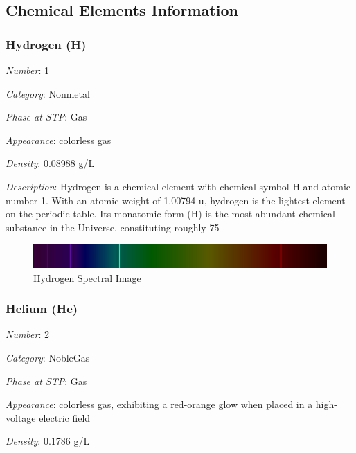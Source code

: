 \documentclass{article}
\begin{document}
\newpage

\subsection{Chemical Elements Information}
\label{anexo:elements_info}

\hypertarget{subsubsection::H}{}\subsubsection{Hydrogen (H)}

\textit{Number}: 1

\textit{Category}: Nonmetal

\textit{Phase at STP}: Gas

\textit{Appearance}: colorless gas

\textit{Density}: 0.08988 g/L

\textit{Description}: Hydrogen is a chemical element with chemical symbol H and atomic number 1. With an atomic weight of 1.00794 u, hydrogen is the lightest element on the periodic table. Its monatomic form (H) is the most abundant chemical substance in the Universe, constituting roughly 75%

\immediate{}
\begin{figure}[!ht]
    \centering
    \includegraphics[width=12cm]{./resources/spectral_img/Hydrogen_Spectra.jpg}
    \caption{Hydrogen Spectral Image}
\end{figure}

\hypertarget{subsubsection::He}{}\subsubsection{Helium (He)}

\textit{Number}: 2

\textit{Category}: NobleGas

\textit{Phase at STP}: Gas

\textit{Appearance}: colorless gas, exhibiting a red-orange glow when placed in a high-voltage electric field

\textit{Density}: 0.1786 g/L
\end{document}
